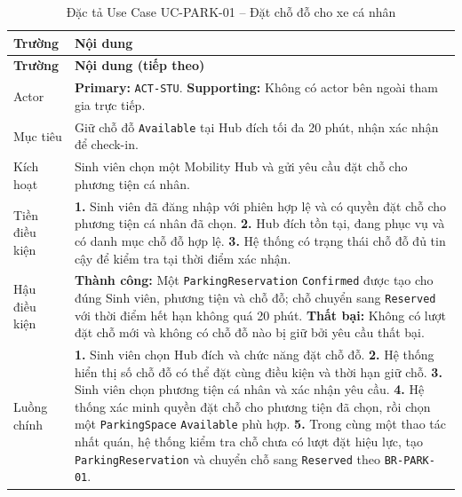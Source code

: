 \begin{longtable}{|L{26mm}|L{118mm}|}
  \caption{Đặc tả Use Case UC-PARK-01 -- Đặt chỗ đỗ cho xe cá nhân}\label{tab:spec-UC-PARK-01}\\
  \hline
  \centering\arraybackslash\textbf{Trường} & \centering\arraybackslash\textbf{Nội dung}\\
  \hline
  \endfirsthead
  \hline
  \centering\arraybackslash\textbf{Trường} & \centering\arraybackslash\textbf{Nội dung (tiếp theo)}\\
  \hline
  \endhead
  Actor & \textbf{Primary:} \texttt{ACT-STU}. \textbf{Supporting:} Không có actor bên ngoài tham gia trực tiếp.\\\hline
  Mục tiêu & Giữ chỗ đỗ \texttt{Available} tại Hub đích tối đa 20 phút, nhận xác nhận để check-in.\\\hline
  Kích hoạt & Sinh viên chọn một Mobility Hub và gửi yêu cầu đặt chỗ cho phương tiện cá nhân.\\\hline
  Tiền điều kiện &
    \textbf{1.} Sinh viên đã đăng nhập với phiên hợp lệ và có quyền đặt chỗ cho phương tiện cá nhân đã chọn.\newline
    \textbf{2.} Hub đích tồn tại, đang phục vụ và có danh mục chỗ đỗ hợp lệ.\newline
    \textbf{3.} Hệ thống có trạng thái chỗ đỗ đủ tin cậy để kiểm tra tại thời điểm xác nhận.\\\hline
  Hậu điều kiện &
    \textbf{Thành công:} Một \texttt{ParkingReservation} \texttt{Confirmed} được tạo cho đúng Sinh viên, phương tiện và chỗ đỗ; chỗ chuyển sang \texttt{Reserved} với thời điểm hết hạn không quá 20 phút.\newline
    \textbf{Thất bại:} Không có lượt đặt chỗ mới và không có chỗ đỗ nào bị giữ bởi yêu cầu thất bại.\\\hline
  Luồng chính &
    \textbf{1.} Sinh viên chọn Hub đích và chức năng đặt chỗ đỗ.\newline
    \textbf{2.} Hệ thống hiển thị số chỗ đỗ có thể đặt cùng điều kiện và thời hạn giữ chỗ.\newline
    \textbf{3.} Sinh viên chọn phương tiện cá nhân và xác nhận yêu cầu.\newline
    \textbf{4.} Hệ thống xác minh quyền đặt chỗ cho phương tiện đã chọn, rồi chọn một \texttt{ParkingSpace} \texttt{Available} phù hợp.\newline
    \textbf{5.} Trong cùng một thao tác nhất quán, hệ thống kiểm tra chỗ chưa có lượt đặt hiệu lực, tạo \texttt{ParkingReservation} và chuyển chỗ sang \texttt{Reserved} theo \texttt{BR-PARK-01}.\newline

\end{longtable}
